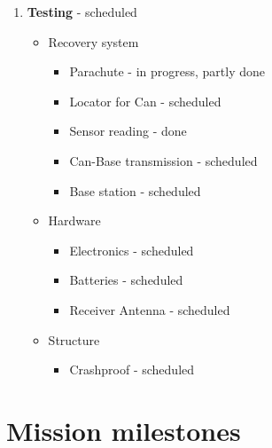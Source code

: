 \documentclass[11pt]{article}
\begin{document}
\begin{enumerate}[]
\begin{itemize}
        \begin{itemize}
            \item Data aggregation - scheduled
            \item Data analysis - scheduled
            \item Reporting - scheduled
        \end{itemize}
    \end{itemize}
    \item \textbf{Testing} - scheduled
    \begin{itemize}
        \item Recovery system
        \begin{itemize}
            \item Parachute - in progress, partly done
            \item Locator for Can - scheduled
        \end{itemize}
        \begin{itemize}
            \item Sensor reading - done
            \item Can-Base transmission - scheduled
            \item Base station - scheduled
        \end{itemize}
        \item Hardware
        \begin{itemize}
            \item Electronics - scheduled
            \item Batteries - scheduled
            \item Receiver Antenna - scheduled
        \end{itemize}
        \item Structure
        \begin{itemize}
            \item Crashproof - scheduled
        \end{itemize}
    \end{itemize}
\end{enumerate}


\section{Mission milestones}\label{A33}
\end{document}
